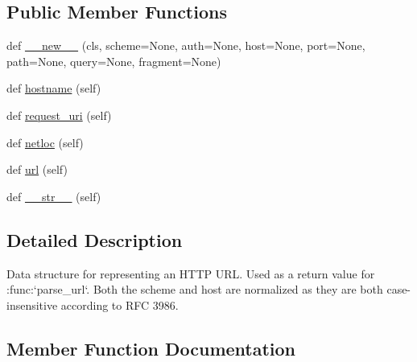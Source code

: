 \subsection*{Public Member Functions}
\begin{DoxyCompactItemize}
\item 
def \hyperlink{classpip_1_1__vendor_1_1urllib3_1_1util_1_1url_1_1Url_a7f132830087363715d8f890bd4a3d160}{\+\_\+\+\_\+new\+\_\+\+\_\+} (cls, scheme=None, auth=None, host=None, port=None, path=None, query=None, fragment=None)
\item 
def \hyperlink{classpip_1_1__vendor_1_1urllib3_1_1util_1_1url_1_1Url_aa97a9e874ee8f76d4c1e4f09d05e7e5d}{hostname} (self)
\item 
def \hyperlink{classpip_1_1__vendor_1_1urllib3_1_1util_1_1url_1_1Url_a55d7eb61b1f1188f3c852b6c63625b4a}{request\+\_\+uri} (self)
\item 
def \hyperlink{classpip_1_1__vendor_1_1urllib3_1_1util_1_1url_1_1Url_a7dc069fbbdfa58864a1f834446adf4df}{netloc} (self)
\item 
def \hyperlink{classpip_1_1__vendor_1_1urllib3_1_1util_1_1url_1_1Url_a412b7e3ce12f35eb2f203ab2c9c142d4}{url} (self)
\item 
def \hyperlink{classpip_1_1__vendor_1_1urllib3_1_1util_1_1url_1_1Url_a3954bff32b7982a63998997836288aaa}{\+\_\+\+\_\+str\+\_\+\+\_\+} (self)
\end{DoxyCompactItemize}


\subsection{Detailed Description}
\begin{DoxyVerb}Data structure for representing an HTTP URL. Used as a return value for
:func:`parse_url`. Both the scheme and host are normalized as they are
both case-insensitive according to RFC 3986.
\end{DoxyVerb}
 

\subsection{Member Function Documentation}
\mbox{\label{classpip_1_1__vendor_1_1urllib3_1_1util_1_1url_1_1Url_a7f132830087363715d8f890bd4a3d160}} 
